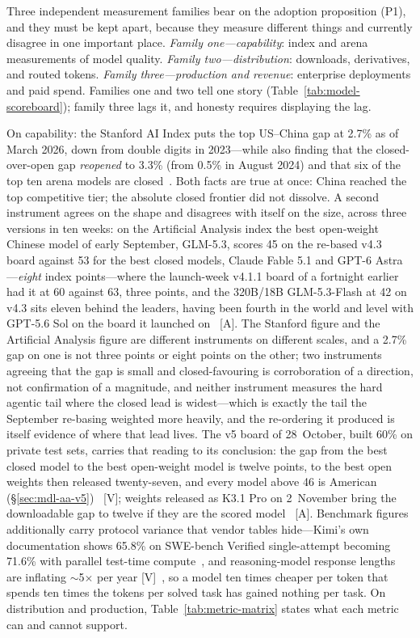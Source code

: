 Three independent measurement families bear on the adoption proposition (P1), and they must be kept apart, because they measure different things and currently disagree in one important place. \emph{Family one---capability}: index and arena measurements of model quality. \emph{Family two---distribution}: downloads, derivatives, and routed tokens. \emph{Family three---production and revenue}: enterprise deployments and paid spend. Families one and two tell one story (Table~\ref{tab:model-scoreboard}); family three lags it, and honesty requires displaying the lag.

On capability: the Stanford AI Index puts the top US--China gap at 2.7\% as of March 2026, down from double digits in 2023---while also finding that the closed-over-open gap \emph{reopened} to 3.3\% (from 0.5\% in August 2024) and that six of the top ten arena models are closed~\cite{stanford-aiindex-2026}. Both facts are true at once: China reached the top competitive tier; the absolute closed frontier did not dissolve. A second instrument agrees on the shape and disagrees with itself on the size, across three versions in ten weeks: on the Artificial Analysis index the best open-weight Chinese model of early September, GLM-5.3, scores 45 on the re-based v4.3 board against 53 for the best closed models, Claude Fable 5.1 and GPT-6 Astra---\emph{eight} index points---where the launch-week v4.1.1 board of a fortnight earlier had it at 60 against 63, three points, and the 320B/18B GLM-5.3-Flash at 42 on v4.3 sits eleven behind the leaders, having been fourth in the world and level with GPT-5.6 Sol on the board it launched on~\cite{glm53-aa,aa-v43} [A]. The Stanford figure and the Artificial Analysis figure are different instruments on different scales, and a 2.7\% gap on one is not three points or eight points on the other; two instruments agreeing that the gap is small and closed-favouring is corroboration of a direction, not confirmation of a magnitude, and neither instrument measures the hard agentic tail where the closed lead is widest---which is exactly the tail the September re-basing weighted more heavily, and the re-ordering it produced is itself evidence of where that lead lives. The v5 board of 28~October, built 60\% on private test sets, carries that reading to its conclusion: the gap from the best closed model to the best open-weight model is twelve points, to the best open weights then released twenty-seven, and every model above 46 is American (\S\ref{sec:mdl-aa-v5})~\cite{mdl-aa-v5} [V]; weights released as K3.1 Pro on 2~November bring the downloadable gap to twelve if they are the scored model~\cite{lit-k31-weights} [A]. Benchmark figures additionally carry protocol variance that vendor tables hide---Kimi's own documentation shows 65.8\% on SWE-bench Verified single-attempt becoming 71.6\% with parallel test-time compute~\cite{kimi-k2-thinking}, and reasoning-model response lengths are inflating $\sim$5$\times$ per year [V]~\cite{epoch-output}, so a model ten times cheaper per token that spends ten times the tokens per solved task has gained nothing per task. On distribution and production, Table~\ref{tab:metric-matrix} states what each metric can and cannot support.

